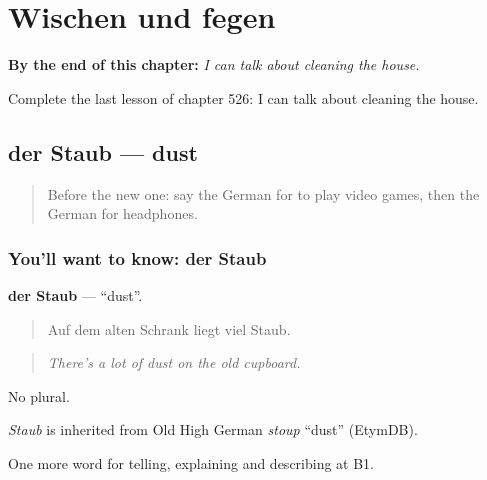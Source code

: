 
\chapter{Wischen und fegen}
\label{ch:ge-wischen-und-fegen}

\begin{chapteropening}
\textbf{By the end of this chapter:} \emph{I can talk about cleaning the house.}

Complete the last lesson of chapter 526: I can talk about cleaning the house.
\end{chapteropening}

\section[der Staub]{der Staub — dust}

\label{lesson:GE-C526-staub}



\begin{quote}
Before the new one: say the German for to play video games, then the German for headphones.
\end{quote}

\subsection*{You'll want to know: der Staub}
\textbf{der Staub} — \textquotedblleft{}dust\textquotedblright{}.

\begin{quote}
Auf dem alten Schrank liegt viel Staub.
\end{quote}

\begin{quote}
\emph{There's a lot of dust on the old cupboard.}
\end{quote}

No plural.

\begin{cousinweb}
\emph{Staub} is inherited from Old High German \emph{stoup} \textquotedblleft{}dust\textquotedblright{} (EtymDB).
\end{cousinweb}

\begin{grammarlens}[title={What you've built}]
One more word for telling, explaining and describing at B1.
\end{grammarlens}

